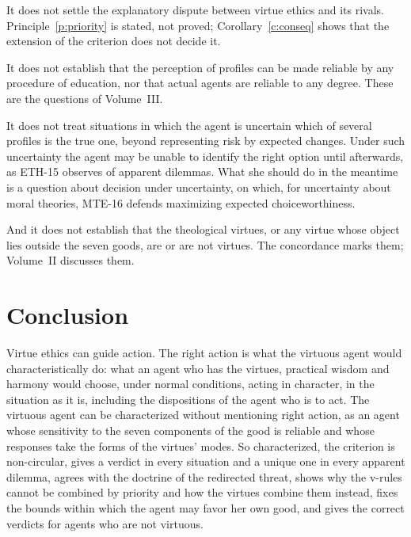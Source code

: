 \documentclass{situationist-preprint}
\begin{document}
It does not settle the explanatory dispute between virtue ethics and its rivals. Principle~\ref{p:priority} is stated, not proved; Corollary~\ref{c:conseq} shows that the extension of the criterion does not decide it.

It does not establish that the perception of profiles can be made reliable by any procedure of education, nor that actual agents are reliable to any degree. These are the questions of Volume~III.

It does not treat situations in which the agent is uncertain which of several profiles is the true one, beyond representing risk by expected changes. Under such uncertainty the agent may be unable to identify the right option until afterwards, as ETH-15 observes of apparent dilemmas. What she should do in the meantime is a question about decision under uncertainty, on which, for uncertainty about moral theories, MTE-16 defends maximizing expected choiceworthiness.

And it does not establish that the theological virtues, or any virtue whose object lies outside the seven goods, are or are not virtues. The concordance marks them; Volume~II discusses them.

\section{Conclusion}\label{s:conclusion}

Virtue ethics can guide action. The right action is what the virtuous agent would characteristically do: what an agent who has the virtues, practical wisdom and harmony would choose, under normal conditions, acting in character, in the situation as it is, including the dispositions of the agent who is to act. The virtuous agent can be characterized without mentioning right action, as an agent whose sensitivity to the seven components of the good is reliable and whose responses take the forms of the virtues' modes. So characterized, the criterion is non-circular, gives a verdict in every situation and a unique one in every apparent dilemma, agrees with the doctrine of the redirected threat, shows why the v-rules cannot be combined by priority and how the virtues combine them instead, fixes the bounds within which the agent may favor her own good, and gives the correct verdicts for agents who are not virtuous.
\end{document}

